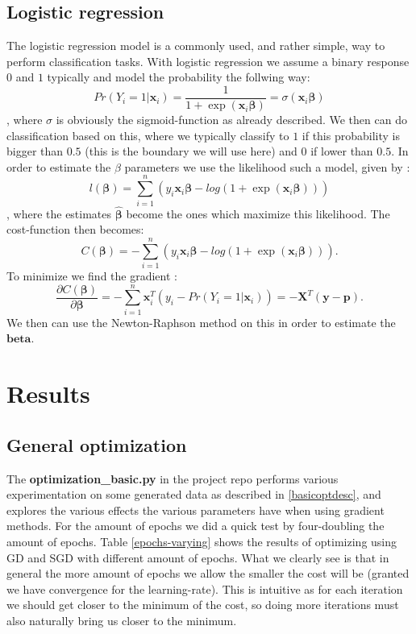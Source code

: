 \documentclass{article}
\begin{document}
\subsection{Logistic regression}
The logistic regression model is a commonly used, and rather simple, way to
perform classification tasks. With logistic regression we assume a binary
response $0$ and $1$ typically and model the probability the follwing way:
$$Pr(Y_i = 1 | \bm{x}_i) = \frac{1}{1 + \exp(\bm{x}_i \bm{\beta})} = \sigma(\bm{x}_i \bm{\beta})$$
, where $\sigma$ is obviously the sigmoid-function as already described. We then
can do classification based on this, where we typically classify to $1$ if this
probability is bigger than $0.5$ (this is the boundary we will use here) and $0$
if lower than $0.5$. In order to estimate the $\beta$ parameters we use the
likelihood such a model, given by \cite[s.~4.4]{hastie2009elements}:
$$l(\bm{\beta}) = \sum_{i=1}^{n} (y_i \bm{x}_i \bm{\beta} - log(1 + \exp(\bm{x}_i \bm{\beta})))$$
, where the estimates $\hat{\bm{\beta}}$ become the ones which maximize this
likelihood. The cost-function then becomes:
$$C(\bm{\beta}) = -\sum_{i=1}^{n} (y_i \bm{x}_i \bm{\beta} - log(1 + \exp(\bm{x}_i \bm{\beta}))).$$
To minimize we find the gradient \cite[s.~4.4]{hastie2009elements}:
$$\frac{\partial C(\bm{\beta})}{\partial \bm{\beta}} = -\sum_{i=1}^{n}\bm{x}_i^T(y_i - Pr(Y_i = 1 | \bm{x}_i)) = -\bm{X}^T(\bm{y} - \bm{p}).$$
We then can use the Newton-Raphson method on this in order to estimate the $\bm{beta}$.

\section{Results}

\subsection{General optimization}
The \textbf{optimization\_basic.py} in the project repo
\cite{githubrepoproject2code} performs various experimentation on some generated
data as described in \ref{basicoptdesc}, and explores the various effects the
various parameters have when using gradient methods. For the amount of epochs we
did a quick test by four-doubling the amount of epochs. Table
\ref{epochs-varying} shows the results of optimizing using GD and SGD with
different amount of epochs. What we clearly see is that in general the more
amount of epochs we allow the smaller the cost will be (granted we have
convergence for the learning-rate). This is intuitive as for each iteration we
should get closer to the minimum of the cost, so doing more iterations must also
naturally bring us closer to the minimum.
\end{document}
